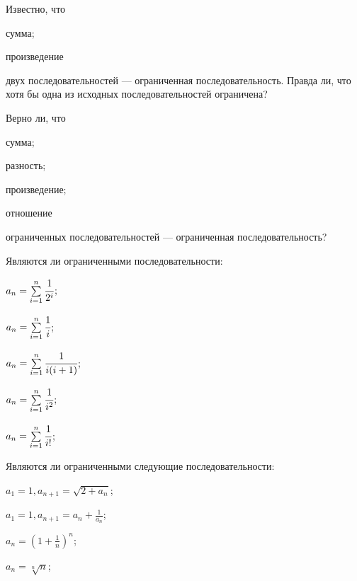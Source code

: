 \documentclass[a4paper, 12pt, num=24, date=06.11.2019]{listok}
\begin{document}
\begin{problem}
    Известно, что
    \begin{probparts}
        \item сумма;
        \item произведение
    \end{probparts}
    двух последовательностей --- ограниченная последовательность.
    Правда ли, что хотя бы одна из исходных последовательностей ограничена?
\end{problem}
\begin{problem}
    Верно ли, что
    \begin{probparts}
        \item сумма;
        \item разность;
        \item произведение;
        \item отношение
    \end{probparts}
    ограниченных последовательностей --- ограниченная последовательность?
\end{problem}
\begin{problem}[$\mathghost$]
    Являются ли ограниченными последовательности:
    \begin{multienum}{3}
        \item $a_n = \sum\limits_{i = 1}^n \cfrac1{2^i}$;
        \item $a_n = \sum\limits_{i = 1}^n \cfrac1i$;
        \item $a_n = \sum\limits_{i = 1}^n \cfrac1{i(i + 1)}$;
        \item $a_n = \sum\limits_{i = 1}^n \cfrac1{i^2}$;
        \item $a_n = \sum\limits_{i = 1}^n \cfrac1{i!}$;
    \end{multienum}
\end{problem}
\begin{problem}[$\mathghost$]\label{exsecond}
    Являются ли ограниченными следующие последовательности:
    \begin{multienum}{3}
        \item $a_1 = 1, a_{n + 1} = \sqrt{2 + a_n}$;
        \item $a_1 = 1, a_{n + 1} = a_n + \frac1{a_n}$;
        \item $a_n = {(1 + \frac1n)}^n$;
        \item $a_n = \sqrt[n]n$;
    \end{multienum}
\end{problem}
\end{document}
